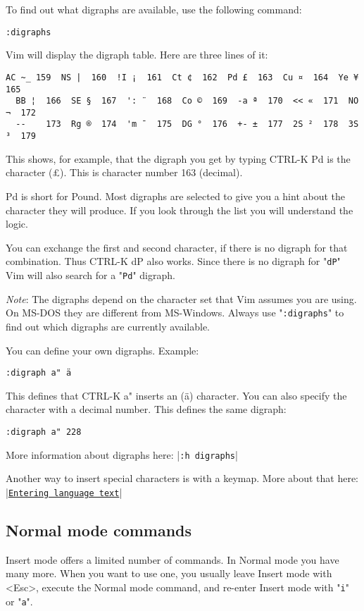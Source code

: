 To find out what digraphs are available, use the following command:

\begin{Verbatim}[samepage=true]
 :digraphs
\end{Verbatim}

Vim will display the digraph table.
Here are three lines of it:

\begin{Verbatim}[samepage=true]
  AC ~_ 159  NS |  160  !I ¡  161  Ct ¢  162  Pd £  163  Cu ¤  164  Ye ¥  165
  BB ¦  166  SE §  167  ': ¨  168  Co ©  169  -a ª  170  << «  171  NO ¬  172
  --    173  Rg ®  174  'm ¯  175  DG °  176  +- ±  177  2S ²  178  3S ³  179 
\end{Verbatim}
 
This shows, for example, that the digraph you get by typing CTRL-K Pd is the character (£).
This is character number 163 (decimal).

Pd is short for Pound.
Most digraphs are selected to give you a hint about the character they will produce.
If you look through the list you will understand the logic.

You can exchange the first and second character, if there is no digraph for that combination.
Thus CTRL-K dP also works.
Since there is no digraph for "\verb!dP!" Vim will also search for a "\verb!Pd!" digraph.

\emph{Note}: The digraphs depend on the character set that Vim assumes you are using.
On MS-DOS they are different from MS-Windows.
Always use "\verb!:digraphs!" to find out which digraphs are currently available.

You can define your own digraphs.  Example:

\begin{Verbatim}[samepage=true]
 :digraph a" ä
\end{Verbatim}

This defines that CTRL-K a" inserts an (ä) character.
You can also specify the character with a decimal number.
This defines the same digraph:

\begin{Verbatim}[samepage=true]
 :digraph a" 228
\end{Verbatim}

More information about digraphs here: |\verb!:h digraphs!|

Another way to insert special characters is with a keymap.
More about that here: |\hyperref[Entering language text]{\texttt{Entering language text}}|
\subsection{Normal mode commands}
Insert mode offers a limited number of commands.
In Normal mode you have many more.
When you want to use one, you usually leave Insert mode with <Esc>, execute the Normal mode command, and re-enter Insert mode with "\verb!i!" or "\verb!a!".

